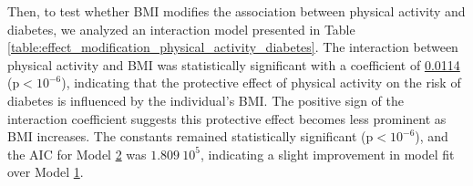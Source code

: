 \documentclass[11pt]{article}
\begin{document}
Then, to test whether BMI modifies the association between physical activity and diabetes, we analyzed an interaction model presented in Table \ref{table:effect_modification_physical_activity_diabetes}. The interaction between physical activity and BMI was statistically significant with a coefficient of \hyperlink{B4a}{0.0114} (p$<$\hyperlink{B4d}{$10^{-6}$}), indicating that the protective effect of physical activity on the risk of diabetes is influenced by the individual's BMI. The positive sign of the interaction coefficient suggests this protective effect becomes less prominent as BMI increases. The constants remained statistically significant (p$<$\hyperlink{B1d}{$10^{-6}$}), and the AIC for Model \hyperlink{R2a}{2} was \hyperlink{R2b}{$1.809\ 10^{5}$}, indicating a slight improvement in model fit over Model \hyperlink{R1a}{1}.
\end{document}
